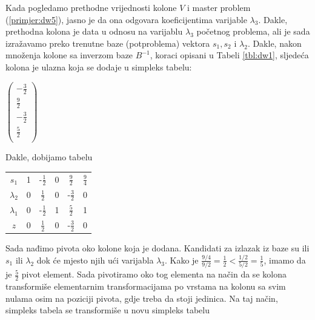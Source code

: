 \documentclass[a4paper, utf8, 11pt, colorlinks]{book}
\begin{document}
Kada pogledamo prethodne vrijednosti kolone $V$ i master problem (\ref{primjer:dw5}), jasno je da ona odgovara koeficijentima varijable $\lambda_3$. Dakle, prethodna kolona je data u odnosu na varijablu $\lambda_3$ početnog problema, ali je sada izražavamo preko trenutne baze (potproblema) vektora $s_1, s_2$ i $\lambda_2$. Dakle, nakon množenja kolone sa inverzom baze $B^{-1}$, koraci opisani u Tabeli \ref{tbl:dw1}, sljedeća kolona je ulazna koja se dodaje u simpleks tabelu:

\begin{center}
 
  $\begin{pmatrix}
	 -\frac{3}{2}            \\
	 \frac{9}{2}     \\
 	-\frac{3}{2}       \\
	 \frac{5}{2}    \\
   \end{pmatrix}$
\end{center}
Dakle, dobijamo tabelu 

\begin{center}
 
		\begin{tabular}{c|cccc|c}
		   $s_1$	    &   1      &   -$\frac{1}{2}$         &   0         &   $\frac{9}{2}$          &  $\frac{9}{4}$ \\
		   $\lambda_2$  &   0      &    $\frac{1}{2}$         &   0         &  -$ \frac{3}{2}$         &  0             \\
		   $\lambda_1$  &   0      &    -$\frac{1}{2}$        &   1         &  $\frac{5}{2} $          &  1             \\ \hline
		   $z$          &   0      &    $\frac{1}{2}$         &   0         &   -$\frac{3}{2}$       & 0  
	\end{tabular}
 
\end{center} 
Sada nađimo pivota oko kolone koja je dodana. Kandidati za izlazak iz baze su ili $s_1$ ili $\lambda_2$ dok će mjesto njih ući varijabla $\lambda_3$. Kako je $\frac{9/4}{9/2}=\frac{1}{2} < \frac{1/2}{5/2}=\frac{1}{5}$, imamo da je $\frac{5}{2}$ pivot element. Sada pivotiramo oko tog elementa na način da se kolona transformiše elementarnim transformacijama po vrstama na kolonu sa svim nulama osim na poziciji pivota, gdje treba da stoji jedinica. Na taj način, simpleks tabela se transformiše u novu simpleks tabelu 
\end{document}
